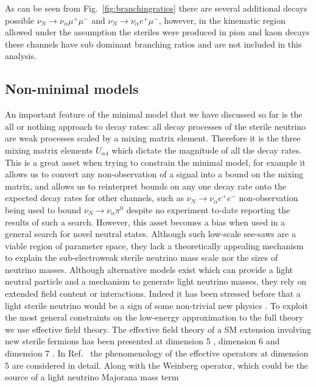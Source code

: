\documentclass[11pt, a4paper]{article}
\newcommand{\reffig}[1]{Fig.~\ref{#1}}
\newcommand{\refref}[1]{Ref.~\cite{#1}}
\begin{document}
As can be seen from \reffig{fig:branchingratios} there are several additional
decays possible $\nu_N \rightarrow \nu_\alpha \mu^+ \mu^-$ and $\nu_N
\rightarrow \nu_\alpha e^+ \mu^-$, however, in the kinematic region allowed
under the assumption the steriles were produced in pion and kaon decays these
channels have sub dominant branching ratios and are not included in this
analysis.

\subsection{Non-minimal models}

An important feature of the minimal model that we have discussed so far is the
all or nothing approach to decay rates: all decay processes of the sterile
neutrino are weak processes scaled by a mixing matrix element. 
%
Therefore it is the three mixing matrix elements $U_{\alpha 4}$ which dictate
the magnitude of all the decay rates. This is a great asset when trying to
constrain the  minimal model, for example it allows us to convert any
non-observation of a signal into a bound on the mixing matrix, and allows us to
reinterpret bounds on any one decay rate onto the expected decay rates for
other channels, such as $\nu_N \rightarrow \nu_\alpha e^+ e^-$ non-observation
being used to bound $\nu_N \rightarrow \nu_\alpha \pi^0$ despite no experiment
to-date reporting the results of such a search. 
%
However, this asset becomes a bias when used in a general search for novel
neutral states. Although such low-scale see-saws are a viable region of
parameter space, they lack a theoretically appealing mechanism to explain the
sub-electroweak sterile neutrino mass scale nor the sizes of neutrino masses.
Although alternative models exist which can provide a light neutral particle
and a mechanism to generate light neutrino masses, they rely on extended field
content or interactions.
%
Indeed it has been stressed before that a light sterile neutrino would be a
sign of some non-trivial new physics \cite{delAguila:2008ir}. To exploit the
most general constraints on the low-energy approximation to the full theory we
use effective field theory. The effective field theory of a SM extension
involving new sterile fermions has been presented at dimension 5
\cite{delAguila:2008ir,Aparici:2009fh}, dimension 6 \cite{delAguila:2008ir} and
dimension 7 \cite{Bhattacharya:2015vja}.
%
In \refref{Aparici:2009fh} the phenomenology of the effective operators at
dimension 5 are considered in detail. Along with the Weinberg operator, which
could be the source of a light neutrino Majorana mass term
\end{document}
